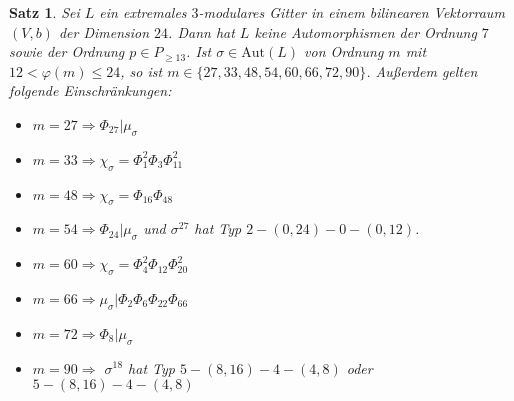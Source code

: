 \documentclass[12pt,a4paper,halfparskip,headsepline,bibtotocnumbered]{scrreprt}
\theoremstyle{nummermitklammern}
\newtheorem{satz}[defsatzusw]{Satz}
\theoremstyle{nonumberbreak}
\newcommand{\Aut}{\text{Aut}}
\begin{document}
\begin{framed}
	\begin{satz}
		Sei $L$ ein extremales $3$-modulares Gitter in einem bilinearen Vektorraum $(V,b)$ der Dimension $24$. Dann hat $L$ keine Automorphismen der Ordnung $7$ sowie der Ordnung $p \in P_{\ge 13}$. Ist $\sigma \in \Aut(L)$ von Ordnung $m$ mit $12 < \varphi(m) \leq 24$, so ist\linebreak
		$m \in \lbrace 27, 33, 48, 54, 60, 66, 72, 90 \rbrace$. Außerdem gelten folgende Einschränkungen:
		\begin{itemize}
			\item $m = 27 \Rightarrow \Phi_{27} \vert \mu_\sigma$
			\item $m = 33 \Rightarrow \chi_\sigma = \Phi_1^2 \Phi_3 \Phi_{11}^2$
			\item $m = 48 \Rightarrow \chi_\sigma = \Phi_{16} \Phi_{48}$
			\item $m = 54 \Rightarrow \Phi_{24} \vert \mu_\sigma$ und $\sigma^{27}$ hat Typ $2 - (0, 24) - 0 - (0, 12)$.
			\item $m = 60 \Rightarrow \chi_\sigma = \Phi_4^2 \Phi_{12} \Phi_{20}^2$
			\item $m = 66 \Rightarrow \mu_\sigma \vert \Phi_{2} \Phi_{6} \Phi_{22} \Phi_{66}$
			\item $m = 72 \Rightarrow \Phi_8 \vert \mu_\sigma$
			\item $m = 90 \Rightarrow$ $\sigma^{18}$ hat Typ $5 - (8, 16) - 4 - (4, 8)$ oder $5 - (8, 16) - 4 - (4, 8)$
		\end{itemize}
	\end{satz}
\end{framed}
\end{document}
